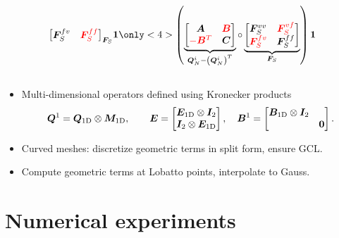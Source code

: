 \documentclass[compress]{beamer}
\theoremstyle{plain}
\newcommand{\LRp}[1]{\left( #1 \right)}
\renewcommand{\note}[1]{\textcolor{red}{{#1}}}
\begin{document}
{\begin{columns}
\begin{column}{.51\textwidth}
\[{{{\begin{bmatrix}
\bm{F}^{fv}_S & \note{\bm{F}^{ff}_S}
\end{bmatrix}}_{\bm{F}_S} } \bm{1}
}
\only<4>{
\LRp{\underbrace{\begin{bmatrix}
\bm{A} & \note{\bm{B}}\\
\note{-\bm{B}^T} & \bm{C}
\end{bmatrix}}_{\bm{Q}_N^i-\LRp{\bm{Q}_N^i}^T} \circ
\underbrace{\begin{bmatrix}
\bm{F}^{vv}_S & \note{\bm{F}^{vf}_S}\\
\note{\bm{F}^{fv}_S} & \bm{F}^{ff}_S
\end{bmatrix}}_{\bm{F}_S} } \bm{1}
}
\]
\end{column}
\end{columns}
\vspace{.5em}

\begin{itemize}
\item Multi-dimensional operators defined using Kronecker products
\[
{\bm{Q}}^1 = \bm{Q}_{\rm 1D} \otimes \bm{M}_{\rm 1D}, \qquad 
\bm{E} = \begin{bmatrix}
\bm{E}_{{\rm 1D}} \otimes \bm{I}_{2}\\
\bm{I}_{2} \otimes \bm{E}_{ {\rm 1D}} 
\end{bmatrix}, \quad 
{\bm{B}}^1 =  \begin{bmatrix}
\bm{B}_{\rm 1D} \otimes \bm{I}_{2} & \\
& \bm{0}
\end{bmatrix}.
\]
\item Curved meshes: discretize geometric terms in split form, ensure GCL.
\item Compute geometric terms at Lobatto points, interpolate to Gauss.
\end{itemize}

\let\thefootnote\relax{}
}


\section{Numerical experiments}

\end{document}
